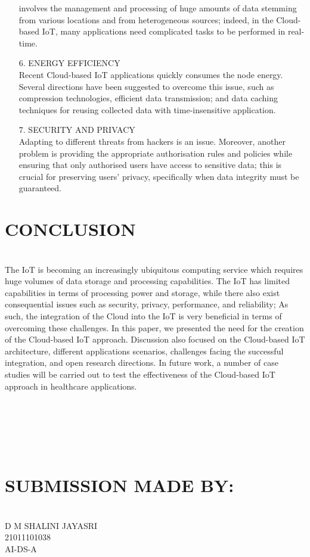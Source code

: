 \documentclass[11pt]{article}
\begin{document}
\begin{itemize}
involves the management and processing of huge amounts of
data stemming from various locations and from heterogeneous
sources; indeed, in the Cloud-based IoT, many applications
need complicated tasks to be performed in real-time. 
\item[6.]ENERGY EFFICIENCY\\
Recent Cloud-based IoT applications quickly consumes the node energy. Several directions have been suggested to overcome this issue, such as compression technologies, efficient data transmission; and data caching techniques for reusing collected data with time-insensitive application. 
\item[7.]SECURITY AND PRIVACY \\
Adapting to different threats from hackers is an issue.
Moreover, another problem is providing the appropriate
authorisation rules and policies while ensuring that only
authorised users have access to sensitive data; this is crucial for preserving users’ privacy, specifically when data integrity must be guaranteed. 
\end{itemize}

\section{CONCLUSION}\\
The IoT is becoming an increasingly ubiquitous computing
service which requires huge volumes of data storage and
processing capabilities. The IoT has limited capabilities in
terms of processing power and storage, while there also exist
consequential issues such as security, privacy, performance,
and reliability; As such, the integration of the Cloud into the
IoT is very beneficial in terms of overcoming these challenges.
In this paper, we presented the need for the creation of the
Cloud-based IoT approach. Discussion also focused on the
Cloud-based IoT architecture, different applications scenarios,
challenges facing the successful integration, and open research
directions. In future work, a number of case studies will be
carried out to test the effectiveness of the Cloud-based IoT
approach in healthcare applications. 
\\
\\
\\
\\
\\
\\
\section*{SUBMISSION MADE BY:}\\
D M SHALINI JAYASRI\\
21011101038\\
AI-DS-A
\end{document}
